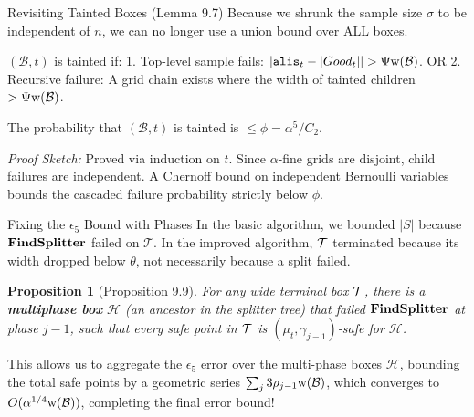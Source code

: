 \documentclass[11pt,aspectratio=169]{beamer}
\newtheorem{prop}[theorem]{Proposition}
\newcommand{\alis}{{\tt alis}}
\newcommand{\width}{{\bf {\rm  w}}}
\newcommand{\findsplitter}{{\rm {\bf FindSplitter}}}
\newcommand{\cT}{{\cal T}}
\begin{document}
\begin{frame}{Revisiting Tainted Boxes (Lemma 9.7)}
    Because we shrunk the sample size $\sigma$ to be independent of $n$, we can no longer use a union bound over ALL boxes.
    
    \begin{definition}
        $(\mathcal{B}, t)$ is tainted if:
        1. Top-level sample fails: $|\alis_t - |Good_t|| > \Psi \width(\mathcal{B})$.
        OR 2. Recursive failure: A grid chain exists where the width of tainted children $> \Psi \width(\mathcal{B})$.
    \end{definition}
    
    \begin{lemma}[Lemma 9.7]
        The probability that $(\mathcal{B}, t)$ is tainted is $\leq \phi = \alpha^5 / C_2$.
    \end{lemma}
    \textit{Proof Sketch:} Proved via induction on $t$. Since $\alpha$-fine grids are disjoint, child failures are independent. A Chernoff bound on independent Bernoulli variables bounds the cascaded failure probability strictly below $\phi$.
\end{frame}

\begin{frame}{Fixing the $\epsilon_5$ Bound with Phases}
    In the basic algorithm, we bounded $|S|$ because $\findsplitter$ failed on $\mathcal{T}$. In the improved algorithm, $\cT$ terminated because its width dropped below $\theta$, not necessarily because a split failed.
    
    \begin{prop}[Proposition 9.9]
        For any wide terminal box $\cT$, there is a \textbf{multiphase box} $\mathcal{H}$ (an ancestor in the splitter tree) that failed $\findsplitter$ at phase $j-1$, such that every safe point in $\cT$ is $(\mu_t, \gamma_{j-1})$-safe for $\mathcal{H}$.
    \end{prop}
    
    This allows us to aggregate the $\epsilon_5$ error over the multi-phase boxes $\mathcal{H}$, bounding the total safe points by a geometric series $\sum_j 3 \rho_{j-1} \width(\mathcal{B})$, which converges to $O(\alpha^{1/4} \width(\mathcal{B}))$, completing the final error bound!
\end{frame}
\end{document}
